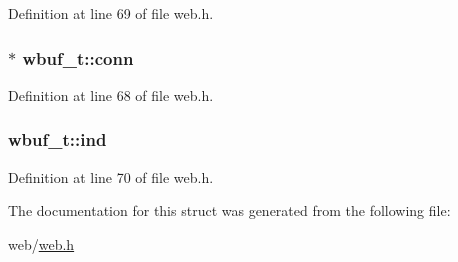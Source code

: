 Definition at line 69 of file web.\-h.

\hypertarget{structwbuf__t_a3ffa6bfa0cc399fc099d59f9e31839f4}{
\subsubsection[{conn}]{$\ast$ wbuf\-\_\-t\-::conn}}\label{structwbuf__t_a3ffa6bfa0cc399fc099d59f9e31839f4}


Definition at line 68 of file web.\-h.

\hypertarget{structwbuf__t_aff9954e8b14b93e6898294df9046b70b}{
\subsubsection[{ind}]{ wbuf\-\_\-t\-::ind}}\label{structwbuf__t_aff9954e8b14b93e6898294df9046b70b}


Definition at line 70 of file web.\-h.



The documentation for this struct was generated from the following file\-:\begin{DoxyCompactItemize}
\item 
web/\hyperlink{web_8h}{web.\-h}\end{DoxyCompactItemize}
